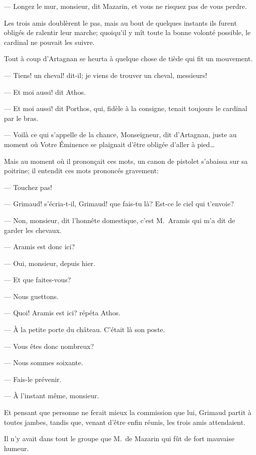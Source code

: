 — Longez le mur, monsieur, dit Mazarin, et vous ne risquez pas de vous perdre.

Les trois amis doublèrent le pas, mais au bout de quelques instants ils furent obligés de ralentir leur marche; quoiqu'il y mît toute la bonne volonté possible, le cardinal ne pouvait les suivre.

Tout à coup d'Artagnan se heurta à quelque chose de tiède qui fit un mouvement.

— Tiens! un cheval! dit-il; je viens de trouver un cheval, messieurs!

— Et moi aussi! dit Athos.

— Et moi aussi! dit Porthos, qui, fidèle à la consigne, tenait toujours le cardinal par le bras.

— Voilà ce qui s'appelle de la chance, Monseigneur, dit d'Artagnan, juste au moment où Votre Éminence se plaignait d'être obligée d'aller à pied\dots

Mais au moment où il prononçait ces mots, un canon de pistolet s'abaissa sur sa poitrine; il entendit ces mots prononcés gravement:

— Touchez pas!

— Grimaud! s'écria-t-il, Grimaud! que fais-tu là? Est-ce le ciel qui t'envoie?

— Non, monsieur, dit l'honnête domestique, c'est M.~Aramis qui m'a dit de garder les chevaux.

— Aramis est donc ici?

— Oui, monsieur, depuis hier.

— Et que faites-vous?

— Nous guettons.

— Quoi! Aramis est ici? répéta Athos.

— À la petite porte du château. C'était là son poste.

— Vous êtes donc nombreux?

— Nous sommes soixante.

— Fais-le prévenir.

— À l'instant même, monsieur.

Et pensant que personne ne ferait mieux la commission que lui, Grimaud partit à toutes jambes, tandis que, venant d'être enfin réunis, les trois amis attendaient.

Il n'y avait dans tout le groupe que M.~de Mazarin qui fût de fort mauvaise humeur.